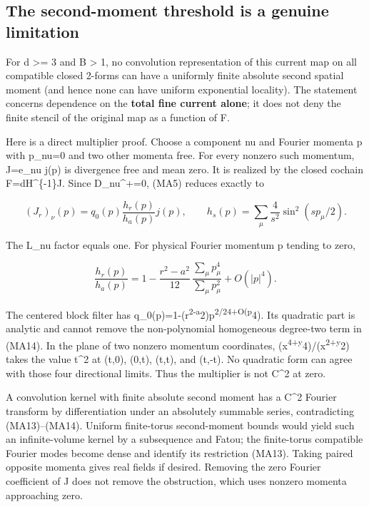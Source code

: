 \documentclass[
  11pt,
]{article}
\begin{document}
\hypertarget{the-second-moment-threshold-is-a-genuine-limitation}{%
\subsection{The second-moment threshold is a genuine
limitation}\label{the-second-moment-threshold-is-a-genuine-limitation}}

For d \textgreater= 3 and B \textgreater{} 1, no convolution
representation of this current map on all compatible closed 2-forms can
have a uniformly finite absolute second spatial moment (and hence none
can have uniform exponential locality). The statement concerns
dependence on the \textbf{total fine current alone}; it does not deny
the finite stencil of the original map as a function of F.

Here is a direct multiplier proof. Choose a component nu and Fourier
momenta p with p\_nu=0 and two other momenta free. For every nonzero
such momentum, J=e\_nu j(p) is divergence free and mean zero. It is
realized by the closed cochain F=dH\^{}\{-1\}J. Since D\_nu\^{}+=0,
(MA5) reduces exactly to

\[
(J_r)_\nu(p)=q_0(p)\frac{h_r(p)}{h_a(p)}j(p),\qquad
h_s(p)=\sum_\mu\frac{4}{s^2}\sin^2(sp_\mu/2).
\tag{MA13}
\]

The L\_nu factor equals one. For physical Fourier momentum p tending to
zero,

\[
\frac{h_r(p)}{h_a(p)}
=1-\frac{r^2-a^2}{12}\,
 \frac{\sum_\mu p_\mu^4}{\sum_\mu p_\mu^2}
 +O(|p|^4).
\tag{MA14}
\]

The centered block filter has
q\_0(p)=1-(r\textsuperscript{2-a}2)\textbar p\textbar{}\textsuperscript{2/24+O(\textbar p\textbar{}}4).
Its quadratic part is analytic and cannot remove the non-polynomial
homogeneous degree-two term in (MA14). In the plane of two nonzero
momentum coordinates,
(x\textsuperscript{4+y}4)/(x\textsuperscript{2+y}2) takes the value
t\^{}2 at (t,0), (0,t), (t,t), and (t,-t). No quadratic form can agree
with those four directional limits. Thus the multiplier is not C\^{}2 at
zero.

A convolution kernel with finite absolute second moment has a C\^{}2
Fourier transform by differentiation under an absolutely summable
series, contradicting (MA13)--(MA14). Uniform finite-torus second-moment
bounds would yield such an infinite-volume kernel by a subsequence and
Fatou; the finite-torus compatible Fourier modes become dense and
identify its restriction (MA13). Taking paired opposite momenta gives
real fields if desired. Removing the zero Fourier coefficient of J does
not remove the obstruction, which uses nonzero momenta approaching zero.
\end{document}
